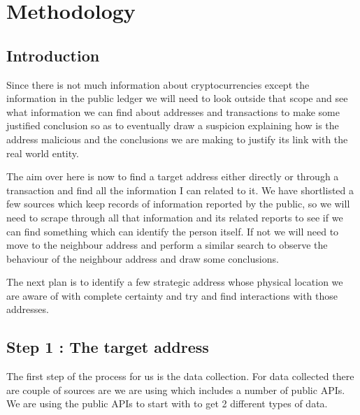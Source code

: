 \documentclass{article}
\begin{document}
\pagebreak
\section{Methodology}
 \subsection{Introduction}
    Since there is not much information about cryptocurrencies except the information in the public ledger we will need to look outside that scope and see what information we can find about addresses and transactions to make some justified conclusion so as to eventually draw a suspicion explaining how is the address malicious and the conclusions we are making to justify its link with the real world entity. 
    
    The aim over here is now to find a target address either directly or through a transaction and find all the information I can related to it. We have shortlisted a few sources which keep records of information reported by the public, so we will need to scrape through all that information and its related reports to see if we can find something which can identify the person itself. If not we will need to move to the neighbour address and perform a similar search to observe the behaviour of the neighbour address and draw some conclusions. 
    
    The next plan is to identify a few strategic address whose physical location we are aware of with complete certainty and try and find interactions with those addresses. 
    
    \subsection{Step 1 : The target address}
        The first step of the process for us is the data collection. For data collected there are couple of sources are we are using which includes a number of public APIs. We are using the public APIs to start with to get 2 different types of data.
        
\end{document}
